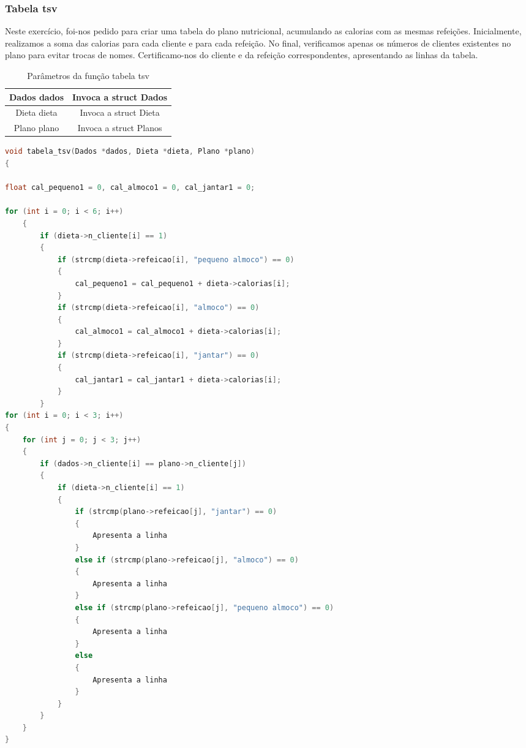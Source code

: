 \documentclass[a4wide]{report}
\begin{document}
\subsubsection{Tabela tsv}
Neste exercício, foi-nos pedido para criar uma tabela do plano nutricional, acumulando as calorias com as mesmas refeições. Inicialmente, realizamos a soma das calorias para cada cliente e para cada refeição. No final, verificamos apenas os números de clientes existentes no plano para evitar trocas de nomes. Certificamo-nos do cliente e da refeição correspondentes, apresentando as linhas da tabela.
\begin{table}[h]
    \centering
    \begin{tabular}{|c|c|} \hline 
          Dados dados& Invoca a struct Dados\\ \hline 
          Dieta dieta& Invoca a struct Dieta\\ \hline 
          Plano plano& Invoca a struct Planos\\ \hline
    \end{tabular}
    \caption{Parâmetros da função tabela tsv}
    \label{tab:my_label}
\end{table}
\begin{lstlisting}[language=C, caption={tabela tsv}, label={codigo:c}, breaklines=true, basicstyle=\small]
void tabela_tsv(Dados *dados, Dieta *dieta, Plano *plano)
{

float cal_pequeno1 = 0, cal_almoco1 = 0, cal_jantar1 = 0;

for (int i = 0; i < 6; i++)
    {
        if (dieta->n_cliente[i] == 1) 
        {
            if (strcmp(dieta->refeicao[i], "pequeno almoco") == 0) 
            {
                cal_pequeno1 = cal_pequeno1 + dieta->calorias[i];
            }
            if (strcmp(dieta->refeicao[i], "almoco") == 0)
            {
                cal_almoco1 = cal_almoco1 + dieta->calorias[i];
            }
            if (strcmp(dieta->refeicao[i], "jantar") == 0) 
            {
                cal_jantar1 = cal_jantar1 + dieta->calorias[i]; 
            }
        }
for (int i = 0; i < 3; i++)
{
    for (int j = 0; j < 3; j++)
    {
        if (dados->n_cliente[i] == plano->n_cliente[j])
        {
            if (dieta->n_cliente[i] == 1)
            {
                if (strcmp(plano->refeicao[j], "jantar") == 0)
                {
                    Apresenta a linha
                }
                else if (strcmp(plano->refeicao[j], "almoco") == 0)
                {
                    Apresenta a linha
                }
                else if (strcmp(plano->refeicao[j], "pequeno almoco") == 0)
                {
                    Apresenta a linha
                }
                else
                {
                    Apresenta a linha
                }
            }
        }
    }
}
\end{lstlisting}
\end{document}
